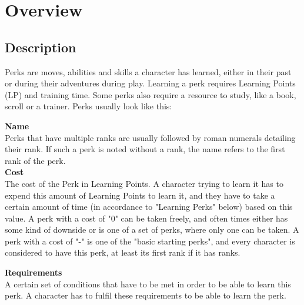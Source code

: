 \chapter{Overview}\label{ch:perksOverview}
\section{Description}\label{sec:perkDescription}
Perks are moves, abilities and skills a character has learned, either in their past or during their adventures during play.
Learning a perk requires Learning Points (LP) and training time.
Some perks also require a resource to study, like a book, scroll or a trainer.
Perks usually look like this:

\textbf{Name}\\
Perks that have multiple ranks are usually followed by roman numerals detailing their rank.
If such a perk is noted without a rank, the name refers to the first rank of the perk.\\

\textbf{Cost}\\
The cost of the Perk in Learning Points.
A character trying to learn it has to expend this amount of Learning Points to learn it, and they have to take a certain amount of time (in accordance to "Learning Perks" below) based on this value. A perk with a cost of "0" can be taken freely, and often times either has some kind of downside or is one of a set of perks, where only one can be taken. A perk with a cost of "-" is one of the "basic starting perks", and every character is considered to have this perk, at least its first rank if it has ranks.

\textbf{Requirements}\\
A certain set of conditions that have to be met in order to be able to learn this perk.
A character has to fulfil these requirements to be able to learn the perk.


